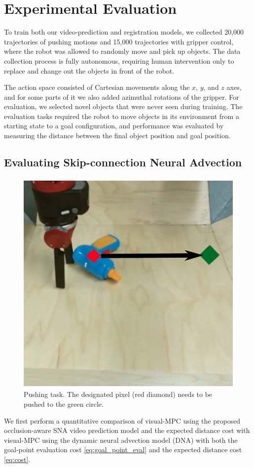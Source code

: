 \section{Experimental Evaluation}
To train both our video-prediction and registration models, we collected 20,000 trajectories of pushing motions and 15,000 trajectories with gripper control, where the robot was allowed to randomly move and pick up objects. The data collection process is fully autonomous, requiring human intervention only to replace and change out the objects in front of the robot.

The action space consisted of Cartesian movements along the $x$, $y$, and $z$ axes, and for some parts of it we also added azimuthal rotations of the gripper. For evaluation, we selected novel objects that were never seen during training. The evaluation tasks required the robot to move objects in its environment from a starting state to a goal configuration, and performance was evaluated by measuring the distance between the final object position and goal position. 

\subsection{Evaluating Skip-connection Neural Advection}
\label{subsec:sna_experiments}
\begin{figure}
	\centering
	\includegraphics[width=0.30\columnwidth]{images_sna/longdistance_pushing/pushing.pdf}
	\caption{
		Pushing task. The designated pixel (red diamond) needs to be pushed to the green circle.
		\label{fig:long_distance_task}
	}
\end{figure}

We first perform a quantitative comparison of visual-MPC using the proposed occlusion-aware SNA video prediction model and the expected distance cost with visual-MPC using the dynamic neural advection model (DNA)\cite{foresight} with both the goal-point evaluation cost \ref{eq:goal_point_eval} and the expected distance cost \ref{eq:cost}.

